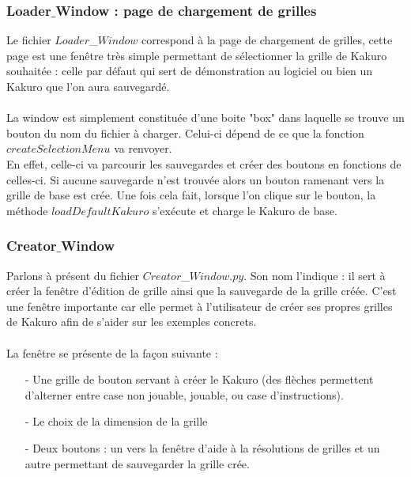 \documentclass[french,12pt]{article}
\begin{document}
\newpage

\subsubsection{Loader$\_$Window : page de chargement de grilles}

Le fichier $Loader$\_$Window$ correspond à la page de chargement de grilles, cette page est une fenêtre très simple permettant de sélectionner la grille de Kakuro souhaitée : celle par défaut qui sert de démonstration au logiciel ou bien un Kakuro que l'on aura sauvegardé. \\ \\
La window est simplement constituée d'une boite "box" dans laquelle se trouve un bouton du nom du fichier à charger. Celui-ci dépend de ce que la fonction $createSelectionMenu$ va renvoyer. \\
En effet, celle-ci va parcourir les sauvegardes et créer des boutons en fonctions de celles-ci. Si aucune sauvegarde n'est trouvée alors un bouton ramenant vers la grille de base est crée. 
Une fois cela fait, lorsque l'on clique sur le bouton, la méthode $loadDefaultKakuro$ s'exécute et charge le Kakuro de base.

\subsubsection{Creator$\_$Window}

Parlons à présent du fichier $Creator$\_$Window.py$. Son nom l'indique : il sert à créer la fenêtre d'édition de grille ainsi que la sauvegarde de la grille créée. C'est une fenêtre importante car elle permet à l'utilisateur de créer ses propres grilles de Kakuro afin de s'aider sur les exemples concrets. \\ \\
La fenêtre se présente de la façon suivante : 

\begin{enumerate}
	\item[-] Une grille de bouton servant à créer le Kakuro (des flèches permettent 			d'alterner entre case non jouable, jouable, ou case d'instructions).
	\item[-] Le choix de la dimension de la grille
	\item[-] Deux boutons : un vers la fenêtre d'aide à la résolutions de grilles et un 		autre permettant de sauvegarder la grille crée. \\
\end{enumerate}
\newpage 
\end{document}
